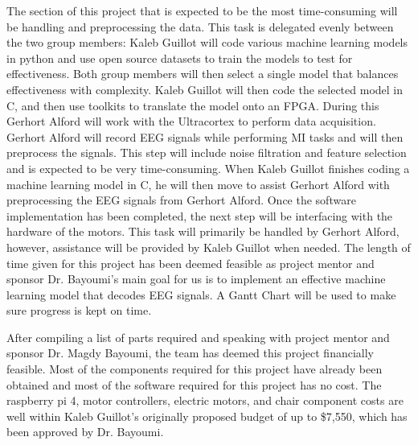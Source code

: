 \documentclass[conference]{IEEEtran}
\begin{document}
    The section of this project that is expected to be the most time-consuming will be handling and preprocessing the data. This task is delegated evenly between the two group members: Kaleb Guillot will code various machine learning models in python and use open source datasets to train the models to test for effectiveness. Both group members will then select a single model that balances effectiveness with complexity. Kaleb Guillot will then code the selected model in C, and then use toolkits to translate the model onto an FPGA. During this Gerhort Alford will work with the Ultracortex to perform data acquisition. Gerhort Alford will record EEG signals while performing MI tasks and will then preprocess the signals. This step will include noise filtration and feature selection and is expected to be very time-consuming. When Kaleb Guillot finishes coding a machine learning model in C, he will then move to assist Gerhort Alford with preprocessing the EEG signals from Gerhort Alford. Once the software implementation has been completed, the next step will be interfacing with the hardware of the motors. This task will primarily be handled by Gerhort Alford, however, assistance will be provided by Kaleb Guillot when needed. The length of time given for this project has been deemed feasible as project mentor and sponsor Dr. Bayoumi's main goal for us is to implement an effective machine learning model that decodes EEG signals. A Gantt Chart will be used to make sure progress is kept on time.
    
    
    After compiling a list of parts required and speaking with project mentor and sponsor Dr. Magdy Bayoumi, the team has deemed this project financially feasible. Most of the components required for this project have already been obtained and most of the software required for this project has no cost. The raspberry pi 4, motor controllers, electric motors, and chair component costs are well within Kaleb Guillot's originally proposed budget of up to \$7,550, which has been approved by Dr. Bayoumi.  
    
\end{document}
